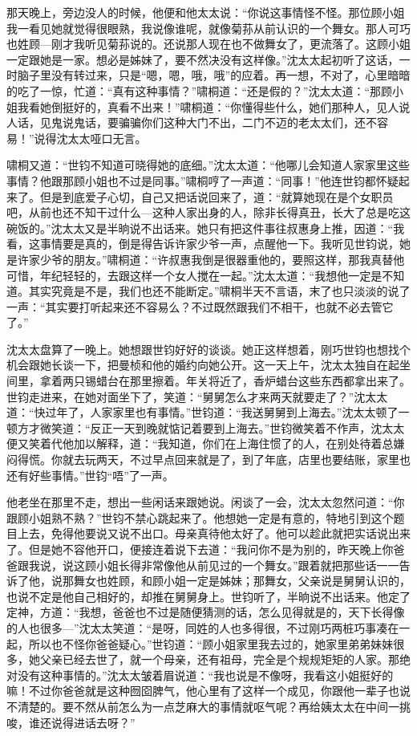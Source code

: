 \par 那天晚上，旁边没人的时候，他便和他太太说：“你说这事情怪不怪。那位顾小姐我一看见她就觉得很眼熟，我说像谁呢，就像菊荪从前认识的一个舞女。那人可巧也姓顾—刚才我听见菊荪说的。还说那人现在也不做舞女了，更流落了。这顾小姐一定跟她是一家。想必是姊妹了，要不然决没有这样像。”沈太太起初听了这话，一时脑子里没有转过来，只是“嗯，嗯，哦，哦”的应着。再一想，不对了，心里暗暗的吃了一惊，忙道：“真有这种事情？”啸桐道：“还是假的？”沈太太道：“那顾小姐我看她倒挺好的，真看不出来！”啸桐道：“你懂得些什么，她们那种人，见人说人话，见鬼说鬼话，要骗骗你们这种大门不出，二门不迈的老太太们，还不容易！”说得沈太太哑口无言。
\par 啸桐又道：“世钧不知道可晓得她的底细。”沈太太道：“他哪儿会知道人家家里这些事情？他跟那顾小姐也不过是同事。”啸桐哼了一声道：“同事！”他连世钧都怀疑起来了。但是到底爱子心切，自己又把话说回来了，道：“就算她现在是个女职员吧，从前也还不知干过什么—这种人家出身的人，除非长得真丑，长大了总是吃这碗饭的。”沈太太又是半晌说不出话来。她只有把这件事往叔惠身上推，因道：“我看，这事情要是真的，倒是得告诉许家少爷一声，点醒他一下。我听见世钧说，她是许家少爷的朋友。”啸桐道：“许叔惠我倒是很器重他的，要照这样，那我真替他可惜，年纪轻轻的，去跟这样一个女人搅在一起。”沈太太道：“我想他一定是不知道。其实究竟是不是，我们也还不能断定。”啸桐半天不言语，末了也只淡淡的说了一声：“其实要打听起来还不容易么？不过既然跟我们不相干，也就不必去管它了。”
\par 沈太太盘算了一晚上。她想跟世钧好好的谈谈。她正这样想着，刚巧世钧也想找个机会跟她长谈一下，把曼桢和他的婚约向她公开。这一天上午，沈太太独自在起坐间里，拿着两只锡蜡台在那里擦着。年关将近了，香炉蜡台这些东西都拿出来了。世钧走进来，在她对面坐下了，笑道：“舅舅怎么才来两天就要走了？”沈太太道：“快过年了，人家家里也有事情。”世钧道：“我送舅舅到上海去。”沈太太顿了一顿方才微笑道：“反正一天到晚就惦记着要到上海去。”世钧微笑着不作声，沈太太便又笑着代他加以解释，道：“我知道，你们在上海住惯了的人，在别处待着总嫌闷得慌。你就去玩两天，不过早点回来就是了，到了年底，店里也要结账，家里也还有好些事情。”世钧“唔”了一声。
\par 他老坐在那里不走，想出一些闲话来跟她说。闲谈了一会，沈太太忽然问道：“你跟顾小姐熟不熟？”世钧不禁心跳起来了。他想她一定是有意的，特地引到这个题目上去，免得他要说又说不出口。母亲真待他太好了。他可以趁此就把实话说出来了。但是她不容他开口，便接连着说下去道：“我问你不是为别的，昨天晚上你爸爸跟我说，说这顾小姐长得非常像他从前见过的一个舞女。”跟着就把那些话一一告诉了他，说那舞女也姓顾，和顾小姐一定是姊妹；那舞女，父亲说是舅舅认识的，也说不定是他自己相好的，却推在舅舅身上。世钧听了，半晌说不出话来。他定了定神，方道：“我想，爸爸也不过是随便猜测的话，怎么见得就是的，天下长得像的人也很多—”沈太太笑道：“是呀，同姓的人也多得很，不过刚巧两桩巧事凑在一起，所以也不怪你爸爸疑心。”世钧道：“顾小姐家里我去过的，她家里弟弟妹妹很多，她父亲已经去世了，就一个母亲，还有祖母，完全是个规规矩矩的人家。那绝对没有这种事情的。”沈太太皱着眉说道：“我也说是不像呀，我看这小姐挺好的嘛！不过你爸爸就是这种囫囵脾气，他心里有了这样一个成见，你跟他一辈子也说不清楚的。要不然从前怎么为一点芝麻大的事情就呕气呢？再给姨太太在中间一挑唆，谁还说得进话去呀？”
